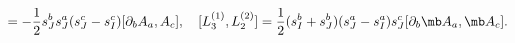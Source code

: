 \begin{equation}
[L^{(2)}_{3},L^{(1)}_{2}]=-\frac{1}{2}s^{b}_{J}s^{a}_{J}  (s^{c}_{J}-s^{c}_{I}) [\partial_{b}A_{a},A_{c}], \quad
[L^{(1)}_{3},L^{(2)}_{2}]=\frac{1}{2}(s^{b}_{I}+s^{b}_{J})(s^{a}_{J}-s^{a}_{I})s^{c}_{J}[\partial_{b}{\mb A}_{a},{\mb A}_{c}].
\end{equation}

